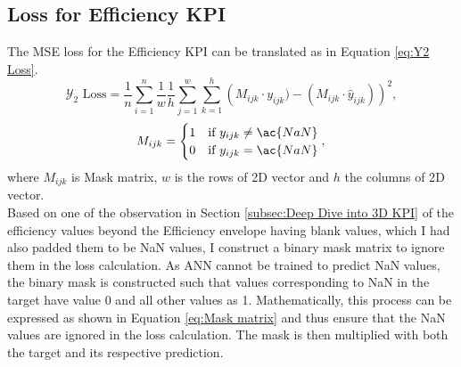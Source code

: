 \documentclass{report} %
\begin{document}
\subsection{Loss for Efficiency KPI}\label{sec:Loss for 3D KPI}

The \ac{MSE} loss for the Efficiency \ac{KPI} can be translated as in Equation \ref{eq:Y2 Loss}.
\begin{equation}
\text{$\mathcal{Y}_2$ Loss} = \frac{1}{n} \sum_{i=1}^{n} \frac{1}{w} \frac{1}{h} \sum_{j=1}^{w} \sum_{k=1}^{h} \left( M_{ijk} \cdot y_{ijk}) - (M_{ijk} \cdot \hat{y}_{ijk})\right)^2,
\label{eq:Y2 Loss}
\end{equation}
\begin{equation}
    M_{ijk} = \begin{cases}
        1 & \text{if } y_{ijk} \neq \ac{NaN} \\
        0 & \text{if } y_{ijk} = \ac{NaN} 
\end{cases} ,\\
\label{eq:Mask matrix}
\end{equation}
where \(M_{ijk}\) is Mask matrix, \(w\) is the rows of 2\ac{D} vector and \(h\) the columns of 2\ac{D} vector.\\
Based on one of the observation in Section \ref{subsec:Deep Dive into 3D KPI} of the efficiency values beyond the Efficiency envelope having blank values, 
which I had also padded them to be \ac{NaN} values, I construct a binary mask matrix to ignore them in the loss calculation.
As \ac{ANN} cannot be trained to predict \ac{NaN} values, the binary mask is constructed such that values corresponding to \ac{NaN} in the target have value 0 and all other values as 1.
Mathematically, this process can be expressed as shown in Equation \ref{eq:Mask matrix} and thus ensure that the \ac{NaN} values are ignored in the loss calculation. 
The mask is then multiplied with both the target and its respective prediction. \\
\end{document}
